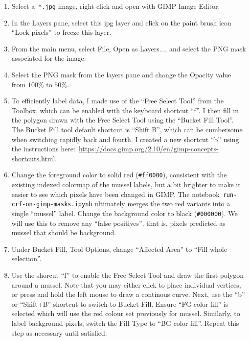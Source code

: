 \documentclass[11pt]{article} %
\begin{document}
\begin{enumerate}
\item Select a~\texttt{*.jpg} image, right click and open with GIMP Image 
Editor.
\item In the Layers pane, select this jpg layer and click on the paint brush 
icon ``Lock pixels'' to freeze this layer.
\item From the main menu, select File, Open as Layers..., and select the PNG 
mask associated for the image.
\item Select the PNG mask from the layers pane and change the Opacity value
from $100\%$ to $50\%$.

\item To efficiently label data, I made use of the ``Free Select Tool'' from
the Toolbox, which can be enabled with the keyboard shortcut ``f''. I then fill
in the polygon drawn with the Free Select Tool using the ``Bucket Fill Tool''. 
The Bucket Fill tool default shortcut is ``Shift B'', which can be cumbersome 
when switching rapidly back and fourth. I created a new shortcut ``b'' using 
the instructions 
here:~\url{https://docs.gimp.org/2.10/en/gimp-concepts-shortcuts.html}.

\item Change the foreground color to solid red (\texttt{\#ff0000}), consistent
with the existing indexed colormap of the mussel labels, but a bit brighter to
make it easier to see which pixels have been changed in GIMP. The
notebook~\texttt{run-crf-on-gimp-masks.ipynb} ultimately merges the two red
variants into a single ``mussel'' label. Change the background color to 
black (\texttt{\#000000}). We will use this to remove any ``false positives'', 
that is, pixels predicted as mussel that should be background.

\item Under Bucket Fill, Tool Options, change ``Affected Area'' to ``Fill whole 
selection''.

\item Use the shorcut ``f'' to enable the Free Select Tool and draw the first 
polygon around a mussel. Note that you may either click to place individual
vertices, or press and hold the left mouse to draw a continous curve. Next, use
the ``b'' or ``Shift+B'' shortcut to switch to Bucket Fill. Ensure ``FG color
fill'' is selected which will use the red colour set previously for mussel. 
Similarly, to label background pixels, switch the Fill Type to ``BG color 
fill''. Repeat this step as necessary until satisfied.


\end{enumerate}
\end{document}
